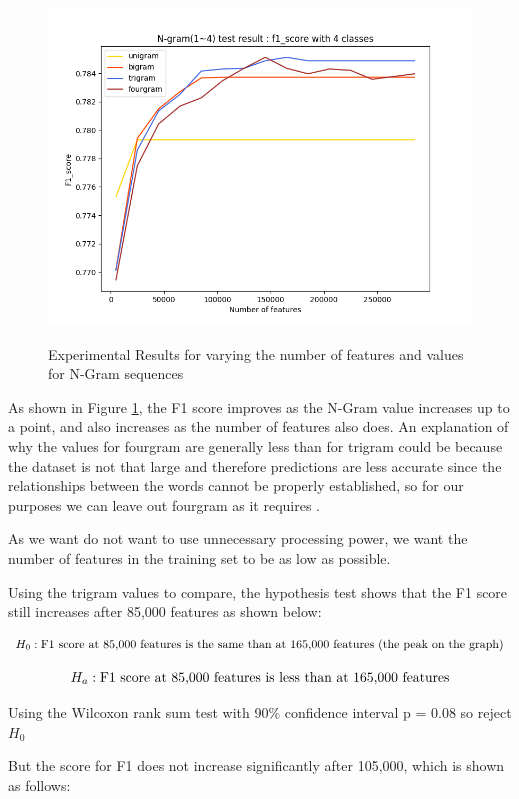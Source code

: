 \begin{figure}[h]
\caption{Experimental Results for varying the number of features and values for N-Gram sequences}
\centering
\includegraphics[scale=0.7]{graphs/nGramBinaryGraph300000.png}
\label{ngramGraph}
\end{figure}

As shown in Figure \ref{ngramGraph}, the F1 score improves as the N-Gram value increases up to a point, and also increases as the number of features also does. An explanation of why the values for fourgram are generally less than for trigram could be because the dataset is not that large and therefore predictions are less accurate since the relationships between the words cannot be properly established, so for our purposes we can leave out fourgram as it requires .

As we want do not want to use unnecessary processing power, we want the number of features in the training set to be as low as possible. 

Using the trigram values to compare, the hypothesis test shows that the F1 score still increases after 85,000 features as shown below:

$$ H_0:  \textnormal{F1 score at 85,000 features is the same than at 165,000 features (the peak on the graph)}$$

$$ H_a: \textnormal{F1 score at 85,000 features is less than at 165,000 features} $$

Using the Wilcoxon rank sum test with 90\% confidence interval 
p = 0.08 so reject $H_0$

But the score for F1 does not increase significantly after 105,000, which is shown as follows:

